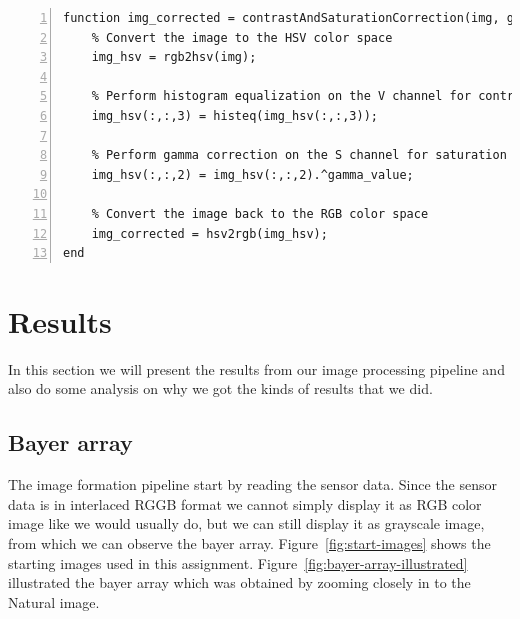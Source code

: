 \documentclass[12pt,a4paper,english
]{tunithesis}
\begin{document}
\begin{lstlisting}[style=Matlab-editor, numbers=left, basicstyle=\small]
function img_corrected = contrastAndSaturationCorrection(img, gamma_value)
    % Convert the image to the HSV color space
    img_hsv = rgb2hsv(img);

    % Perform histogram equalization on the V channel for contrast correction
    img_hsv(:,:,3) = histeq(img_hsv(:,:,3));

    % Perform gamma correction on the S channel for saturation correction
    img_hsv(:,:,2) = img_hsv(:,:,2).^gamma_value;

    % Convert the image back to the RGB color space
    img_corrected = hsv2rgb(img_hsv);
end
\end{lstlisting}


\chapter{Results}
\label{sec:results}
In this section we will present the results from our image processing pipeline and also do some analysis on why we got the kinds of results that we did.

\section{Bayer array}
The image formation pipeline start by reading the sensor data. Since the sensor data is in interlaced RGGB format we cannot simply display it as RGB color image like we would usually do, but we can still display it as grayscale image, from which we can observe the bayer array. Figure~\ref{fig:start-images} shows the starting images used in this assignment. Figure~\ref{fig:bayer-array-illustrated} illustrated the bayer array which was obtained by zooming closely in to the Natural image.
\end{document}
